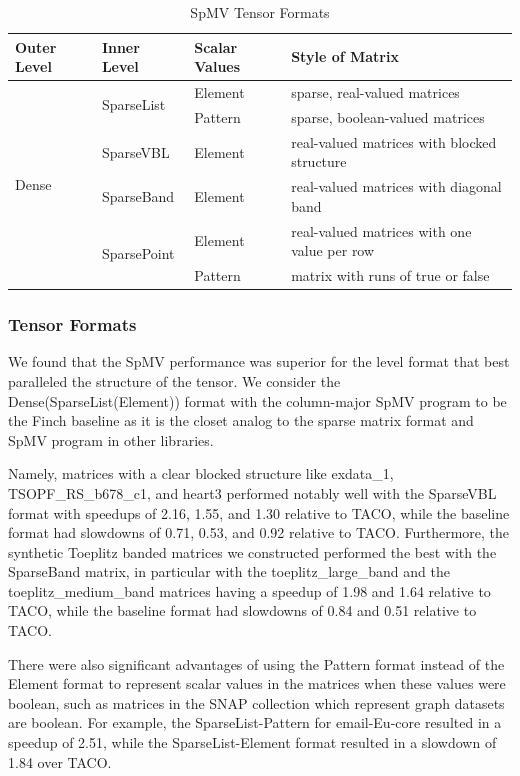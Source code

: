 \begin{table}[htbp]
    \footnotesize
    \centering
    \caption{SpMV Tensor Formats}
    \label{spmv_tensor_formats}
    \begin{tabular}{|l|l|l|l|}
        \hline
        \textbf{Outer Level} & \textbf{Inner Level} & \textbf{Scalar Values} & \textbf{Style of Matrix}\\
        \hline
        \multirow{6}{*}{Dense} & \multirow{2}{*}{SparseList} & Element & sparse, real-valued matrices \\
        \cline{3-4} 
        & & Pattern & sparse, boolean-valued matrices \\
        \cline{2-4} 
        & SparseVBL & Element & real-valued matrices with blocked structure \\
        \cline{2-4}
        & SparseBand & Element & real-valued matrices with diagonal band \\
        \cline{2-4}
        & \multirow{2}{*}{SparsePoint} & Element & real-valued matrices with one value per row \\
        \cline{3-4} 
        & & Pattern & matrix with runs of true or false \\
        \hline 
    \end{tabular}
\end{table}

\subsubsection{Tensor Formats}
We found that the SpMV performance was superior for the level format that best paralleled the structure of the tensor. We consider the Dense(SparseList(Element)) format with the column-major SpMV program to be the Finch baseline as it is the closet analog to the sparse matrix format and SpMV program in other libraries.  

Namely, matrices with a clear blocked structure like exdata\_1, TSOPF\_RS\_b678\_c1, and heart3 performed notably well with the SparseVBL format with speedups of 2.16, 1.55, and 1.30 relative to TACO, while the baseline format had slowdowns of 0.71, 0.53, and 0.92 relative to TACO. Furthermore, the synthetic Toeplitz banded matrices we constructed performed the best with the SparseBand matrix, in particular with the toeplitz\_large\_band and the toeplitz\_medium\_band matrices having a speedup of 1.98 and 1.64 relative to TACO, while the baseline format had slowdowns of 0.84 and 0.51 relative to TACO.

There were also significant advantages of using the Pattern format instead of the Element format to represent scalar values in the matrices when these values were boolean, such as matrices in the SNAP collection which represent graph datasets are boolean. For example, the SparseList-Pattern for email-Eu-core resulted in a speedup of 2.51, while the SparseList-Element format resulted in a slowdown of 1.84 over TACO.


